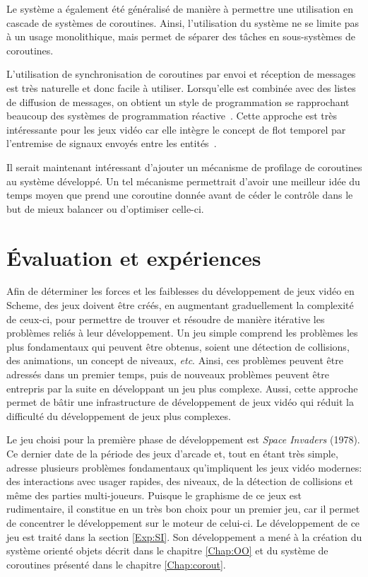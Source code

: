 \documentclass[12pt,twoside,letterpaper,francais]{book}
\begin{document}
Le système a également été généralisé de manière à permettre une
utilisation en cascade de systèmes de coroutines. Ainsi, l'utilisation
du système ne se limite pas à un usage monolithique, mais permet de
séparer des tâches en sous-systèmes de coroutines.

L'utilisation de synchronisation de coroutines par envoi et réception
de messages est très naturelle et donc facile à utiliser. Lorsqu'elle
est combinée avec des listes de diffusion de messages, on obtient un
style de programmation se rapprochant beaucoup des systèmes de
programmation réactive~\cite{FRP}. Cette approche est très
intéressante pour les jeux vidéo car elle intègre le concept de flot
temporel par l'entremise de signaux envoyés entre les
entités~\cite{yampa}.

Il serait maintenant intéressant d'ajouter un mécanisme de profilage
de coroutines au système développé. Un tel mécanisme permettrait
d'avoir une meilleur idée du temps moyen que prend une coroutine
donnée avant de céder le contrôle dans le but de mieux balancer ou
d'optimiser celle-ci.

\clearpage

\chapter{Évaluation et expériences}\label{Chap:exp}
Afin de déterminer les forces et les faiblesses du dévelop\-pement de
jeux vidéo en Scheme, des jeux doivent être créés, en augmentant
graduellement la complexité de ceux-ci, pour permettre de trouver et
résoudre de manière itérative les problèmes reliés à leur
dévelop\-pement. Un jeu simple comprend les problèmes les plus
fondamentaux qui peuvent être obtenus, soient une détection de
collisions, des animations, un concept de niveaux,
\textit{etc}. Ainsi, ces problèmes peuvent être adressés dans un
premier temps, puis de nouveaux problèmes peuvent être entrepris par
la suite en développant un jeu plus complexe. Aussi, cette approche
permet de bâtir une infrastructure de dévelop\-pement de jeux vidéo
qui réduit la difficulté du dévelop\-pement de jeux plus complexes.

Le jeu choisi pour la première phase de dévelop\-pement est \textit{Space Invaders}
(1978). Ce dernier date de la période des jeux d'arcade et, tout en
étant très simple, adresse plusieurs problèmes fondamentaux
qu'impliquent les jeux vidéo modernes: des interactions avec usager
rapides, des niveaux, de la détection de collisions et même des
parties multi-joueurs. Puisque le graphisme de ce jeux est
rudimentaire, il constitue en un très bon choix pour un premier jeu,
car il permet de concentrer le dévelop\-pement sur le moteur de
celui-ci. Le dévelop\-pement de ce jeu est traité dans la section
\ref{Exp:SI}. Son dévelop\-pement a mené à la création du système
orienté objets décrit dans le chapitre \ref{Chap:OO} et du système de
coroutines présenté dans le chapitre \ref{Chap:corout}.
\end{document}
